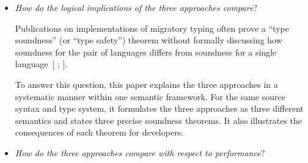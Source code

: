 \documentclass[screen=true, 10pt, acmsmall]{acmart}
\makeatletter
\newlength{\stabLeft}
\newcommand{\atItemizeStart}[0]{\addtolength{\stabLeft}{\labelsep}
                                \addtolength{\stabLeft}{\labelwidth}}
\newcommand{\Sendabbrev}[1]{#1\@}
\newcommand{\AutobibLink}[1]{\color{ACMPurple}{#1}}
\newcommand{\Autobibref}[1]{#1}
\providecommand{\AutobibLink}[1]{#1}
\makeatother
\begin{document}
\noindent \begin{itemize}\atItemizeStart

\item \textit{How do the logical implications of the three approaches compare}?

Publications on implementations of migratory typing often prove a
{``}type soundness{''} (or {``}type safety{''}) theorem without formally discussing
how soundness for the pair of languages differs
from soundness for a single language\Autobibref{~[\hyperref[t:x28autobib_x22Aseem_Rastogix2c_Nikhil_Swamyx2c_Cxe9dric_Fournetx2c_Gavin_Biermanx2c_and_Panagiotis_VekrisSafe_x26_Efficient_Gradual_Typing_for_TypeScriptSymposium_on_Principles_of_Programming_Languagesx2c_ppx2e_167x2dx2d1802015x22x29]{\AutobibLink{Rastogi et al\Sendabbrev{.}}} \hyperref[t:x28autobib_x22Aseem_Rastogix2c_Nikhil_Swamyx2c_Cxe9dric_Fournetx2c_Gavin_Biermanx2c_and_Panagiotis_VekrisSafe_x26_Efficient_Gradual_Typing_for_TypeScriptSymposium_on_Principles_of_Programming_Languagesx2c_ppx2e_167x2dx2d1802015x22x29]{\AutobibLink{2015}}; \hyperref[t:x28autobib_x22Michael_Mx2e_Vitousekx2c_Cameron_Swordsx2c_and_Jeremy_Gx2e_SiekBig_Types_in_Little_Runtimex3a_Openx2dWorld_Soundness_and_Collaborative_Blame_for_Gradual_Type_SystemsSymposium_on_Principles_of_Programming_Languagesx2c_ppx2e_762x2dx2d7742017x22x29]{\AutobibLink{Vitousek et al\Sendabbrev{.}}} \hyperref[t:x28autobib_x22Michael_Mx2e_Vitousekx2c_Cameron_Swordsx2c_and_Jeremy_Gx2e_SiekBig_Types_in_Little_Runtimex3a_Openx2dWorld_Soundness_and_Collaborative_Blame_for_Gradual_Type_SystemsSymposium_on_Principles_of_Programming_Languagesx2c_ppx2e_762x2dx2d7742017x22x29]{\AutobibLink{2017}}]}.

To answer this question, this paper explains the three
approaches in a systematic manner within one semantic framework. For the
same source syntax and type system, it formulates the three approaches as three
different semantics and states three precise soundness theorems.
It also illustrates the consequences of each theorem for developers.

\item \textit{How do the three approaches compare with respect to performance}?


\end{itemize}
\end{document}
